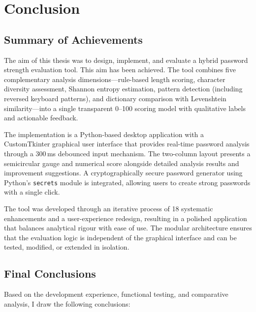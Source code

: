 
\clearpage

\chapter{Conclusion}

\section{Summary of Achievements}

The aim of this thesis was to design, implement, and evaluate a hybrid password strength evaluation tool. This aim has been achieved. The tool combines five complementary analysis dimensions---rule-based length scoring, character diversity assessment, Shannon entropy estimation, pattern detection (including reversed keyboard patterns), and dictionary comparison with Levenshtein similarity---into a single transparent 0--100 scoring model with qualitative labels and actionable feedback.

The implementation is a Python-based desktop application with a CustomTkinter graphical user interface that provides real-time password analysis through a 300\,ms debounced input mechanism. The two-column layout presents a semicircular gauge and numerical score alongside detailed analysis results and improvement suggestions. A cryptographically secure password generator using Python's \texttt{secrets} module is integrated, allowing users to create strong passwords with a single click.

The tool was developed through an iterative process of 18 systematic enhancements and a user-experience redesign, resulting in a polished application that balances analytical rigour with ease of use. The modular architecture ensures that the evaluation logic is independent of the graphical interface and can be tested, modified, or extended in isolation.

\clearpage

\section{Final Conclusions}

Based on the development experience, functional testing, and comparative analysis, I draw the following conclusions:

